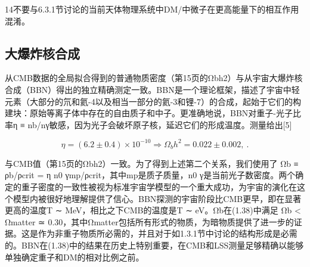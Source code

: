 14不要与6.3.1节讨论的当前天体物理系统中DM/中微子在更高能量下的相互作用混淆。

\subsection{大爆炸核合成} 

从CMB数据的全局拟合得到的普通物质密度（第15页的Ωbh2）与从宇宙大爆炸核合成（BBN）得出的独立精确测定一致。BBN是一个理论框架，描述了宇宙中轻元素（大部分的氘和氦-4以及相当一部分的氦-3和锂-7）的合成，起始于它们的构建块：原始等离子体中存在的自由质子和中子。更准确地说，BBN对重子-光子比率η ≡ nb/nγ敏感，因为光子会破坏原子核，延迟它们的形成温度。测量给出[5]

\[ \eta = (6.2 \pm 0.4) \times 10^{-10} \Rightarrow \Omega_b h^2 = 0.022 \pm 0.002,~. \]

与CMB值（第15页的Ωbh2）一致。为了得到上述第二个关系，我们使用了 Ωb ≡ ρb/ρcrit = η n0 γmp/ρcrit，其中mp是质子质量，n0 γ是当前光子数密度。两个确定的重子密度的一致性被视为标准宇宙学模型的一个重大成功，为宇宙的演化在这个模型内被很好地理解提供了信心。BBN探测的宇宙阶段比CMB更早，即在显著更高的温度T ∼ MeV，相比之下CMB的温度是T ∼ eV。Ωb在(1.38)中满足 Ωb < Ωmatter ≃ 0.30，其中Ωmatter包括所有形式的物质，为暗物质提供了进一步的证据。这是作为非重子物质所必需的，并且对于如1.3.1节中讨论的结构形成是必需的。BBN在(1.38)中的结果在历史上特别重要，在CMB和LSS测量足够精确以能够单独确定重子和DM的相对比例之前。





